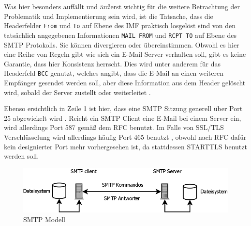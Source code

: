 Was hier besonders auffällt und äußerst wichtig für die weitere Betrachtung der Problematik und Implementierung sein wird, ist die Tatsache, dass die Headerfelder \verb#From# und \verb#To# auf Ebene des IMF praktisch losgelöst sind von den tatsächlich angegebenen Informationen \verb#MAIL FROM# und \verb#RCPT TO# auf Ebene des SMTP Protokolls. Sie können divergieren oder übereinstimmen. Obwohl es hier eine Reihe von Regeln gibt wie sich ein E-Mail Server verhalten soll, gibt es keine Garantie, dass hier Konsistenz herrscht. Dies wird unter anderem für das Headerfeld \verb#BCC# genutzt, welches angibt, dass die E-Mail an einen weiteren Empfänger gesendet werden soll, aber diese Information aus dem Header gelöscht wird, sobald der Server zustellt oder weiterleitet .

Ebenso ersichtlich in Zeile 1 ist hier, dass eine SMTP Sitzung generell über Port 25 abgewickelt wird . Reicht ein SMTP Client eine E-Mail bei einem Server ein, wird allerdings Port 587 gemäß dem RFC  benutzt. Im Falle von SSL/TLS Verschlüsselung wird allerdings häufig Port 465 benutzt , obwohl nach RFC  dafür kein designierter Port mehr vorhergesehen ist, da stattdessen STARTTLS benutzt werden soll.

\begin{figure}[htb]
	\centering
	\includegraphics[scale=0.4]{Content/Intro/Protokolle/SMTP-Model.png}
	\caption{SMTP Modell}
	\label{fig:smtpmodel}
\end{figure}
